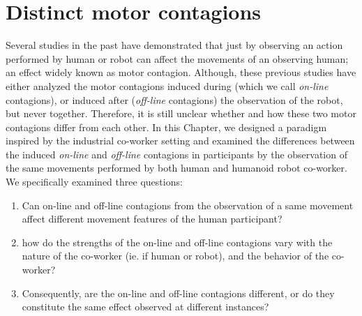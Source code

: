 
{\color{blue}\chapter{Distinct motor contagions}\label{distinct motor contagion}}


Several studies in the past have demonstrated that just by observing an action performed by human or robot can affect the movements of an observing human; an effect widely known as motor contagion. Although, these previous studies have either analyzed the motor contagions induced during (which we call \emph{on-line} contagions), or induced after (\emph{off-line} contagions) the observation of the robot, but never together. Therefore, it is still unclear whether and how these two motor contagions differ from each other. In this Chapter, we designed a paradigm inspired by the industrial co-worker setting and examined the differences between the induced \textit{on-line} and \textit{off-line} contagions in participants by the observation of the same movements performed by both human and humanoid robot co-worker. We specifically examined three questions:

\begin{enumerate}
	\item Can on-line and off-line contagions from the observation of a same movement affect different movement features of the human participant?
	\item how do the strengths of the on-line and off-line contagions vary with the nature of the co-worker (ie. if human or robot), and the behavior of the co-worker?
	\item Consequently, are the on-line and off-line contagions different, or do they constitute the same effect observed at different instances?
\end{enumerate}



